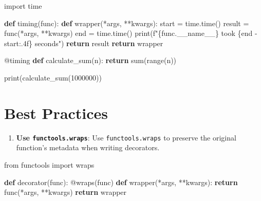 \documentclass[
  letterpaper,
  DIV=11,
  numbers=noendperiod]{scrreprt}
\newenvironment{Shaded}{\begin{snugshade}}{\end{snugshade}}
\newcommand{\AttributeTok}[1]{\textcolor[rgb]{0.40,0.45,0.13}{#1}}
\newcommand{\BuiltInTok}[1]{\textcolor[rgb]{0.00,0.23,0.31}{#1}}
\newcommand{\ControlFlowTok}[1]{\textcolor[rgb]{0.00,0.23,0.31}{\textbf{#1}}}
\newcommand{\DecValTok}[1]{\textcolor[rgb]{0.68,0.00,0.00}{#1}}
\newcommand{\ImportTok}[1]{\textcolor[rgb]{0.00,0.46,0.62}{#1}}
\newcommand{\KeywordTok}[1]{\textcolor[rgb]{0.00,0.23,0.31}{\textbf{#1}}}
\newcommand{\NormalTok}[1]{\textcolor[rgb]{0.00,0.23,0.31}{#1}}
\newcommand{\OperatorTok}[1]{\textcolor[rgb]{0.37,0.37,0.37}{#1}}
\newcommand{\SpecialCharTok}[1]{\textcolor[rgb]{0.37,0.37,0.37}{#1}}
\newcommand{\SpecialStringTok}[1]{\textcolor[rgb]{0.13,0.47,0.30}{#1}}
\newcommand{\VariableTok}[1]{\textcolor[rgb]{0.07,0.07,0.07}{#1}}
\providecommand{\tightlist}{%
  \setlength{\itemsep}{0pt}\setlength{\parskip}{0pt}}\usepackage{longtable,booktabs,array}
\begin{document}
\begin{Shaded}
\begin{Highlighting}[]
\ImportTok{import}\NormalTok{ time}

\KeywordTok{def}\NormalTok{ timing(func):}
    \KeywordTok{def}\NormalTok{ wrapper(}\OperatorTok{*}\NormalTok{args, }\OperatorTok{**}\NormalTok{kwargs):}
\NormalTok{        start }\OperatorTok{=}\NormalTok{ time.time()}
\NormalTok{        result }\OperatorTok{=}\NormalTok{ func(}\OperatorTok{*}\NormalTok{args, }\OperatorTok{**}\NormalTok{kwargs)}
\NormalTok{        end }\OperatorTok{=}\NormalTok{ time.time()}
        \BuiltInTok{print}\NormalTok{(}\SpecialStringTok{f"}\SpecialCharTok{\{}\NormalTok{func}\SpecialCharTok{.}\VariableTok{\_\_name\_\_}\SpecialCharTok{\}}\SpecialStringTok{ took }\SpecialCharTok{\{}\NormalTok{end }\OperatorTok{{-}}\NormalTok{ start}\SpecialCharTok{:.4f\}}\SpecialStringTok{ seconds"}\NormalTok{)}
        \ControlFlowTok{return}\NormalTok{ result}
    \ControlFlowTok{return}\NormalTok{ wrapper}

\AttributeTok{@timing}
\KeywordTok{def}\NormalTok{ calculate\_sum(n):}
    \ControlFlowTok{return} \BuiltInTok{sum}\NormalTok{(}\BuiltInTok{range}\NormalTok{(n))}

\BuiltInTok{print}\NormalTok{(calculate\_sum(}\DecValTok{1000000}\NormalTok{))}
\end{Highlighting}
\end{Shaded}

\section{Best Practices}\label{best-practices-3}

\begin{enumerate}
\def\labelenumi{\arabic{enumi}.}
\tightlist
\item
  \textbf{Use \texttt{functools.wraps}}: Use \texttt{functools.wraps} to
  preserve the original function's metadata when writing decorators.
\end{enumerate}

\begin{Shaded}
\begin{Highlighting}[]
\ImportTok{from}\NormalTok{ functools }\ImportTok{import}\NormalTok{ wraps}

\KeywordTok{def}\NormalTok{ decorator(func):}
    \AttributeTok{@wraps}\NormalTok{(func)}
    \KeywordTok{def}\NormalTok{ wrapper(}\OperatorTok{*}\NormalTok{args, }\OperatorTok{**}\NormalTok{kwargs):}
        \ControlFlowTok{return}\NormalTok{ func(}\OperatorTok{*}\NormalTok{args, }\OperatorTok{**}\NormalTok{kwargs)}
    \ControlFlowTok{return}\NormalTok{ wrapper}
\end{Highlighting}
\end{Shaded}
\end{document}
